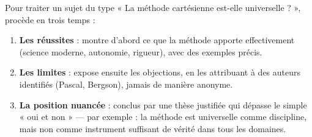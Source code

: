 \documentclass[11pt]{article}
\begin{document}
\begin{methode}
Pour traiter un sujet du type « La méthode cartésienne est-elle universelle ? », procède en trois temps :
\begin{enumerate}
\item \textbf{Les réussites} : montre d'abord ce que la méthode apporte effectivement (science moderne, autonomie, rigueur), avec des exemples précis.
\item \textbf{Les limites} : expose ensuite les objections, en les attribuant à des auteurs identifiés (Pascal, Bergson), jamais de manière anonyme.
\item \textbf{La position nuancée} : conclus par une thèse justifiée qui dépasse le simple « oui et non » — par exemple : la méthode est universelle comme discipline, mais non comme instrument suffisant de vérité dans tous les domaines.
\end{enumerate}
\end{methode}
\end{document}
